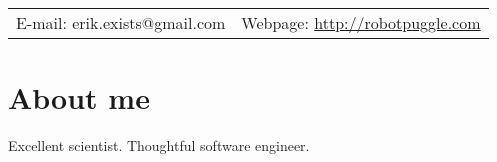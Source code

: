 \documentclass[margin,line]{res}
\begin{document}
\newcommand{\link}[1]{\texttt{#1}}
\providecommand{\tightlist}{%
    \setlength{\itemsep}{0pt}\setlength{\parskip}{0pt}}



\begin{resume}
\section{\sc }
\vspace{.05in}

\begin{tabular}{@{}p{2in}p{4in}}
{E-mail:}  erik.exists@gmail.com   & {Webpage:} \href{http://robotpuggle.com}{http://robotpuggle.com} \\
\end{tabular}

\vspace{-.2cm}
\section{\sc About me}
Excellent scientist. Thoughtful software engineer.







\end{resume}
\end{document}
